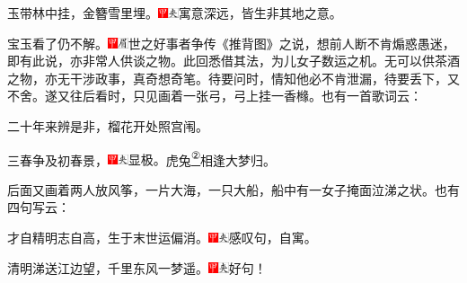 玉带林中挂，金簪雪里埋。{\includegraphics[width=3mm]{../Images/00002}\includegraphics[width=3mm]{../Images/00012}\footnotesize \kaishu 寓意深远，皆生非其地之意。}

宝玉看了仍不解。{\includegraphics[width=3mm]{../Images/00002}\includegraphics[width=3mm]{../Images/00010}\footnotesize \kaishu 世之好事者争传《推背图》之说，想前人断不肯煽惑愚迷，即有此说，亦非常人供谈之物。此回悉借其法，为儿女子数运之机。无可以供茶酒之物，亦无干涉政事，真奇想奇笔。}待要问时，情知他必不肯泄漏，待要丢下，又不舍。遂又往后看时，只见画着一张弓，弓上挂一香橼。也有一首歌词云：

二十年来辨是非，榴花开处照宫闱。

三春争及初春景，{\includegraphics[width=3mm]{../Images/00002}\includegraphics[width=3mm]{../Images/00012}\footnotesize \kaishu 显极。}虎兔\href{../Text/part0009_split_000.html\#lnkback_2_a}{\textsuperscript{②}}相逢大梦归。

后面又画着两人放风筝，一片大海，一只大船，船中有一女子掩面泣涕之状。也有四句写云：

才自精明志自高，生于末世运偏消。{\includegraphics[width=3mm]{../Images/00002}\includegraphics[width=3mm]{../Images/00012}\footnotesize \kaishu 感叹句，自寓。}

清明涕送江边望，千里东风一梦遥。{\includegraphics[width=3mm]{../Images/00002}\includegraphics[width=3mm]{../Images/00012}\footnotesize \kaishu 好句！}

